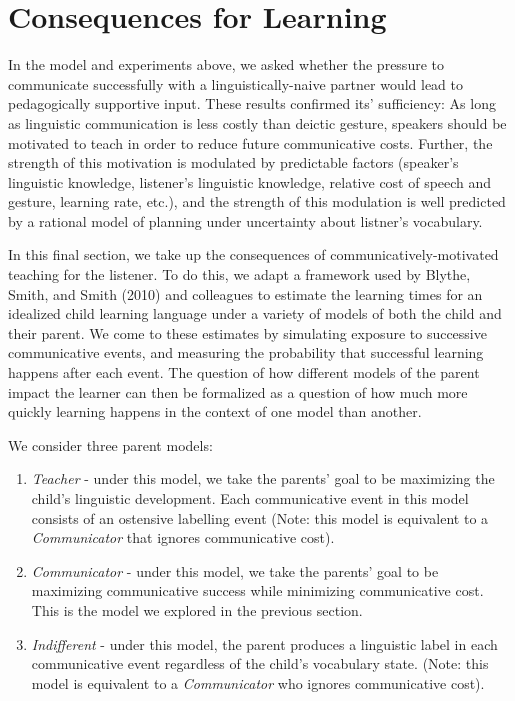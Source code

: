 \documentclass[english,,man,floatsintext]{apa6}
\begin{document}
\hypertarget{consequences-for-learning}{%
\section{Consequences for Learning}\label{consequences-for-learning}}

In the model and experiments above, we asked whether the pressure to communicate successfully with a linguistically-naive partner would lead to pedagogically supportive input. These results confirmed its' sufficiency: As long as linguistic communication is less costly than deictic gesture, speakers should be motivated to teach in order to reduce future communicative costs. Further, the strength of this motivation is modulated by predictable factors (speaker's linguistic knowledge, listener's linguistic knowledge, relative cost of speech and gesture, learning rate, etc.), and the strength of this modulation is well predicted by a rational model of planning under uncertainty about listner's vocabulary.

In this final section, we take up the consequences of communicatively-motivated teaching for the listener. To do this, we adapt a framework used by Blythe, Smith, and Smith (2010) and colleagues to estimate the learning times for an idealized child learning language under a variety of models of both the child and their parent. We come to these estimates by simulating exposure to successive communicative events, and measuring the probability that successful learning happens after each event. The question of how different models of the parent impact the learner can then be formalized as a question of how much more quickly learning happens in the context of one model than another.

We consider three parent models:

\begin{enumerate}
\def\labelenumi{\arabic{enumi}.}
\item
  \emph{Teacher} - under this model, we take the parents' goal to be maximizing the child's linguistic development. Each communicative event in this model consists of an ostensive labelling event (Note: this model is equivalent to a \emph{Communicator} that ignores communicative cost).
\item
  \emph{Communicator} - under this model, we take the parents' goal to be maximizing communicative success while minimizing communicative cost. This is the model we explored in the previous section.
\item
  \emph{Indifferent} - under this model, the parent produces a linguistic label in each communicative event regardless of the child's vocabulary state. (Note: this model is equivalent to a \emph{Communicator} who ignores communicative cost).
\end{enumerate}
\end{document}
